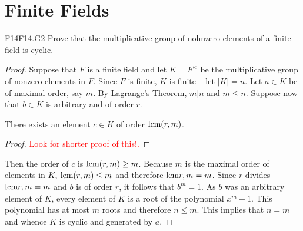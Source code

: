 \documentclass[../AlgebraQualSolutions.tex]{subfiles}
\begin{document}
\section{Finite Fields}

\begin{prob}{F14}{F14.G2}
	Prove that the multiplicative group of nohnzero elements of a finite field is cyclic.
\end{prob}

\begin{proof}
	Suppose that $F$ is a finite field and let $K = F^\times$ be the multiplicative group of nonzero elements in $F$. Since $F$ is finite, $K$ is finite -- let $|K| = n$. Let $a \in K$ be of maximal order, say $m$. By Lagrange's Theorem, $m | n$ and $m \leq n$. Suppose now that $b \in K$ is arbitrary and of order $r$.

	\begin{claim}
		There exists an element $c \in K$ of order $\textrm{lcm}(r,m)$.

		\begin{proof}
			\textcolor{red}{Look for shorter proof of this!.}
		\end{proof}
	\end{claim}

	Then the order of $c$ is $\textrm{lcm}(r,m) \geq m$. Because $m$ is the maximal order of elements in $K$, $\textrm{lcm}(r,m) \leq m$ and therefore $\textrm{lcm}{r,m} = m$. Since $r$ divides $\textrm{lcm}{r,m} = m$ and $b$ is of order $r$, it follows that $b^m = 1$. As $b$ was an arbitrary element of $K$, every element of $K$ is a root of the polynomial $x^m - 1$. This polynomial has at most $m$ roots and therefore $n \leq m$. This implies that $n = m$ and whence $K$ is cyclic and generated by $a$.
\end{proof}
\end{document}
